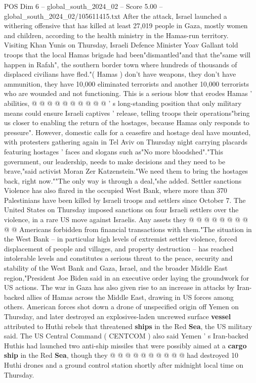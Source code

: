 \begin{textsample}{POS Dim 6 – global\_south\_2024\_02 – Score 5.00 – global\_south\_2024\_02/105611415.txt}
After the attack, Israel launched a withering offensive that has killed at least 27,019 people in Gaza, mostly women and children, according to the health ministry in the Hamas-run territory.
Visiting Khan Yunis on Thursday, Israeli Defence Minister Yoav Gallant told troops that the local Hamas brigade had been"dismantled"and that the"same will happen in Rafah", the southern border town where hundreds of thousands of displaced civilians have fled."( Hamas ) don't have weapons, they don't have ammunition, they have 10,000 eliminated terrorists and another 10,000 terrorists who are wounded and not functioning.
This is a serious blow that erodes Hamas ' abilities, @ @ @ @ @ @ @ @ @ @ ' s long-standing position that only military means could ensure Israeli captives ' release, telling troops their operations"bring us closer to enabling the return of the hostages, because Hamas only responds to pressure".
However, domestic calls for a ceasefire and hostage deal have mounted, with protesters gathering again in Tel Aviv on Thursday night carrying placards featuring hostages ' faces and slogans such as"No more bloodshed"."This government, our leadership, needs to make decisions and they need to be brave,"said activist Moran Zer Katzenstein."We need them to bring the hostages back, right now.""The only way is through a deal,"she added.
Settler sanctions Violence has also flared in the occupied West Bank, where more than 370 Palestinians have been killed by Israeli troops and settlers since October 7.
The United States on Thursday imposed sanctions on four Israeli settlers over the violence, in a rare US move against Israelis.
Any assets they @ @ @ @ @ @ @ @ @ @ Americans forbidden from financial transactions with them."The situation in the West Bank -- in particular high levels of extremist settler violence, forced displacement of people and villages, and property destruction -- has reached intolerable levels and constitutes a serious threat to the peace, security and stability of the West Bank and Gaza, Israel, and the broader Middle East region,"President Joe Biden said in an executive order laying the groundwork for US actions.
The war in Gaza has also given rise to an increase in attacks by Iran-backed allies of Hamas across the Middle East, drawing in US forces among others.
American forces shot down a drone of unspecified origin off Yemen on Thursday, and later destroyed an explosives-laden uncrewed surface \textbf{vessel} attributed to Huthi rebels that threatened \textbf{ships} in the Red \textbf{Sea}, the US military said.
The US Central Command ( CENTCOM ) also said Yemen ' s Iran-backed Huthis had launched two anti-ship missiles that were possibly aimed at a \textbf{cargo} \textbf{ship} in the Red \textbf{Sea}, though they @ @ @ @ @ @ @ @ @ @ had destroyed 10 Huthi drones and a ground control station shortly after midnight local time on Thursday.

\end{textsample}
